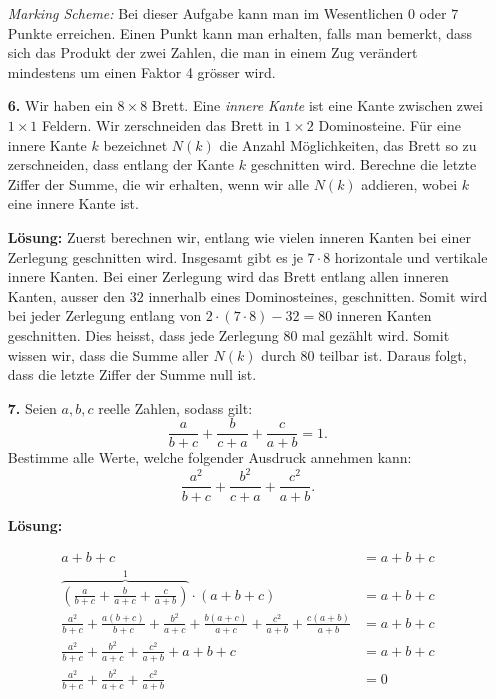 \documentclass[language=german,style=solution]{smo}
\begin{document}
\begin{enumerate}
\textit{Marking Scheme:} Bei dieser Aufgabe kann man im Wesentlichen $0$ oder $7$ Punkte erreichen. Einen Punkt kann man erhalten, falls man bemerkt, dass sich das Produkt der zwei Zahlen, die man in einem Zug verändert mindestens um einen Faktor 4 grösser wird.

\newpage

\item[\textbf{6.}] 
Wir haben ein $8 \times 8$ Brett. Eine \emph{innere Kante} ist eine Kante zwischen zwei $1 \times 1$ Feldern. Wir zerschneiden das Brett in $1 \times 2$ Dominosteine. Für eine innere Kante $k$ bezeichnet $N(k)$ die Anzahl Möglichkeiten, das Brett so zu zerschneiden, dass entlang der Kante $k$ geschnitten wird. Berechne die letzte Ziffer der Summe, die wir erhalten, wenn wir alle $N(k)$ addieren, wobei $k$ eine innere Kante ist.

\textbf{Lösung:} Zuerst berechnen wir, entlang wie vielen inneren Kanten bei einer Zerlegung geschnitten wird. Insgesamt gibt es je $7 \cdot 8$ horizontale und vertikale innere Kanten. Bei einer Zerlegung wird das Brett entlang allen inneren Kanten, ausser den $32$ innerhalb eines Dominosteines, geschnitten. Somit wird bei jeder Zerlegung entlang von $2 \cdot (7 \cdot 8) - 32 = 80$ inneren Kanten geschnitten. Dies heisst, dass jede Zerlegung $80$ mal gezählt wird. Somit wissen wir, dass die Summe aller $N(k)$ durch $80$ teilbar ist. Daraus folgt, dass die letzte Ziffer der Summe null ist. 

\newpage

\item[\textbf{7.}] Seien $a,b,c$ reelle Zahlen, sodass gilt:
\[
\frac{a}{b+c}+\frac{b}{c+a}+\frac{c}{a+b} = 1.
\]
Bestimme alle Werte, welche folgender Ausdruck annehmen kann:
\[
\frac{a^2}{b+c}+\frac{b^2}{c+a}+\frac{c^2}{a+b}.
\]

\textbf{Lösung:}

\begin{align*}
a+b+c &= a+b+c\\
\overbrace{\left( \frac{a}{b+c}+\frac{b}{a+c}+\frac{c}{a+b}\right)}^{1} \cdot (a+b+c) &=a+b+c\\
\frac{a^2}{b+c}+\frac{a(b+c)}{b+c}+\frac{b^2}{a+c}+\frac{b(a+c)}{a+c}+\frac{c^2}{a+b}+\frac{c(a+b)}{a+b}&=a+b+c\\
\frac{a^2}{b+c}+\frac{b^2}{a+c}+\frac{c^2}{a+b}+a+b+c &= a+b+c\\
\frac{a^2}{b+c}+\frac{b^2}{a+c}+\frac{c^2}{a+b} &= 0
\end{align*}

\newpage


\end{enumerate}
\end{document}
